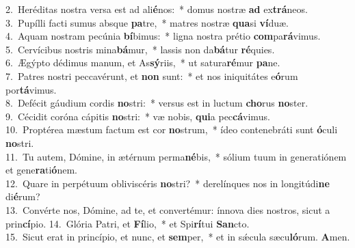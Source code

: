 {2.~}Heréditas nostra versa est ad ali\textbf{é}nos:~* domus nostræ \textbf{ad} ex\textbf{trá}neos.\\
{3.~}Pupílli facti sumus absque \textbf{pa}tre,~* matres nostræ \textbf{qua}si \textbf{ví}duæ.\\
{4.~}Aquam nostram pecúnia \textbf{bí}bimus:~* ligna nostra prétio \textbf{com}pa\textbf{rá}vimus.\\
{5.~}Cervícibus nostris mina\textbf{bá}mur,~* lassis non da\textbf{bá}tur \textbf{ré}quies.\\
{6.~}Ægýpto dédimus manum, et As\textbf{sý}riis,~* ut satura\textbf{ré}mur \textbf{pa}ne.\\
{7.~}Patres nostri peccavérunt, et \textbf{non} sunt:~* et nos iniquitátes e\textbf{ó}rum por\textbf{tá}vimus.\\
{8.~}Defécit gáudium cordis \textbf{no}stri:~* versus est in luctum \textbf{cho}rus \textbf{no}ster.\\
{9.~}Cécidit coróna cápitis \textbf{no}stri:~* væ nobis, \textbf{qui}a pec\textbf{cá}vimus.\\
{10.~}Proptérea mæstum factum est cor \textbf{no}strum,~* ídeo contenebráti sunt \textbf{ó}culi \textbf{no}stri.\\
{11.~}Tu autem, Dómine, in ætérnum perma\textbf{né}bis,~* sólium tuum in generatiónem et gene\textbf{ra}ti\textbf{ó}nem.\\
{12.~}Quare in perpétuum obliviscéris \textbf{no}stri?~* derelínques nos in longitúdi\textbf{ne} di\textbf{é}rum?\\
{13.~}Convérte nos, Dómine, ad te, et convertémur: ínnova dies nostros, sicut a prin\textbf{cí}pio.
{14.~}Glória Patri, et \textbf{Fí}lio,~* et Spi\textbf{rí}tui \textbf{San}cto.\\
{15.~}Sicut erat in princípio, et nunc, et \textbf{sem}per,~* et in sǽcula sæcu\textbf{ló}rum. \textbf{A}men.\\
